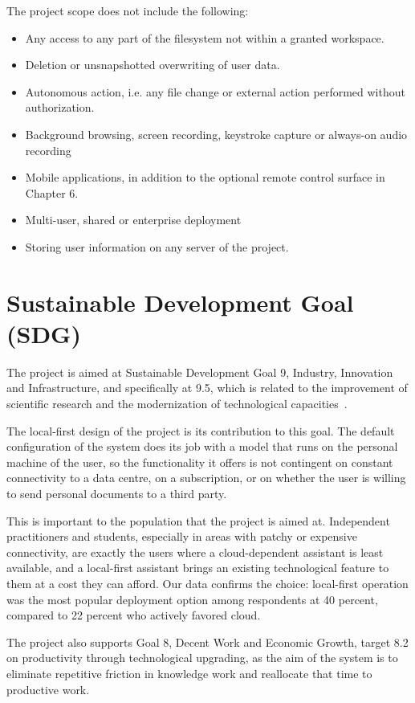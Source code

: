 \documentclass{FastFyp}
\begin{document}
The project scope does not include the following:

\begin{itemize}
    \item Any access to any part of the filesystem not within a granted workspace.
    \item Deletion or unsnapshotted overwriting of user data.
    \item Autonomous action, i.e. any file change or external action performed without authorization.
    \item Background browsing, screen recording, keystroke capture or always-on audio recording
    \item Mobile applications, in addition to the optional remote control surface in Chapter 6.
    \item Multi-user, shared or enterprise deployment
    \item Storing user information on any server of the project.
\end{itemize}

\section{Sustainable Development Goal (SDG)}
The project is aimed at Sustainable Development Goal 9, Industry, Innovation and Infrastructure, and specifically at 9.5, which is related to the improvement of scientific research and the modernization of technological capacities~\cite{ref:sdg}.

The local-first design of the project is its contribution to this goal. The default configuration of the system does its job with a model that runs on the personal machine of the user, so the functionality it offers is not contingent on constant connectivity to a data centre, on a subscription, or on whether the user is willing to send personal documents to a third party.

This is important to the population that the project is aimed at. Independent practitioners and students, especially in areas with patchy or expensive connectivity, are exactly the users where a cloud-dependent assistant is least available, and a local-first assistant brings an existing technological feature to them at a cost they can afford. Our data confirms the choice: local-first operation was the most popular deployment option among respondents at 40 percent, compared to 22 percent who actively favored cloud.

The project also supports Goal 8, Decent Work and Economic Growth, target 8.2 on productivity through technological upgrading, as the aim of the system is to eliminate repetitive friction in knowledge work and reallocate that time to productive work.
\end{document}
